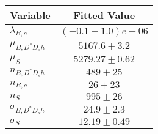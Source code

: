 \begin{tabular}[t]{lc}
\hline
Variable &Fitted Value\\
\hline\hline
$\lambda_{B,c}$&$(-0.1\pm1.0)e-06$\\
\hline
$\mu_{B, D^* D_s h}$&$5167.6\pm3.2$\\
\hline
$\mu_S$&$5279.27\pm0.62$\\
\hline
$n_{B, D^* D_s h}$&$489\pm25$\\
\hline
$n_{B,c}$&$26\pm23$\\
\hline
$n_S$&$995\pm26$\\
\hline
$\sigma_{B, D^* D_s h}$&$24.9\pm2.3$\\
\hline
$\sigma_S$&$12.19\pm0.49$\\
\hline
\end{tabular}